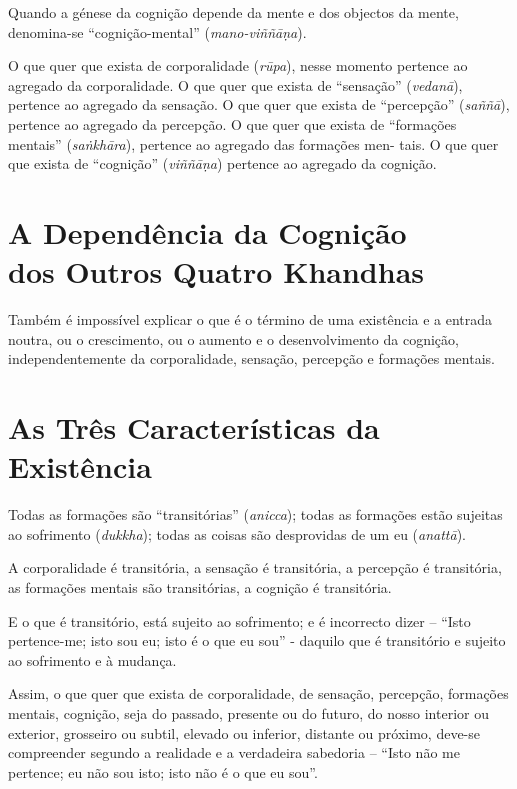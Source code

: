 Quando a génese da cognição depende da mente e dos objectos da mente,
denomina-se ``cognição-mental'' (\emph{mano-viññāṇa}).


O que quer que exista de corporalidade (\emph{rūpa}), nesse momento pertence ao
agregado da corporalidade. O que quer que exista de ``sensação''
(\emph{vedanā}), pertence ao agregado da sensação. O que quer que exista de
``percepção'' (\emph{saññā}), pertence ao agregado da percepção. O que quer que
exista de ``formações mentais'' (\emph{saṅkhāra}), pertence ao agregado das
formações men- tais. O que quer que exista de ``cognição'' (\emph{viññāṇa})
pertence ao agregado da cognição.


\section{A Dependência da Cognição\\ dos Outros Quatro Khandhas}

Também é impossível explicar o que é o término de uma existência e a entrada
noutra, ou o crescimento, ou o aumento e o desenvolvimento da cognição,
independentemente da corporalidade, sensação, percepção e formações mentais.


\section{As Três Características da Existência}


Todas as formações são ``transitórias'' (\emph{anicca}); todas as formações
estão sujeitas ao sofrimento (\emph{dukkha}); todas as coisas são desprovidas de
um eu (\emph{anattā}).


A corporalidade é transitória, a sensação é transitória, a percepção é
transitória, as formações mentais são transitórias, a cognição é transitória.

E o que é transitório, está sujeito ao sofrimento; e é incorrecto dizer --
``Isto pertence-me; isto sou eu; isto é o que eu sou'' - daquilo que é
transitório e sujeito ao sofrimento e à mudança.

Assim, o que quer que exista de corporalidade, de sensação, percepção, formações
mentais, cognição, seja do passado, presente ou do futuro, do nosso interior ou
exterior, grosseiro ou subtil, elevado ou inferior, distante ou próximo, deve-se
compreender segundo a realidade e a verdadeira sabedoria -- ``Isto não me
pertence; eu não sou isto; isto não é o que eu sou''.

